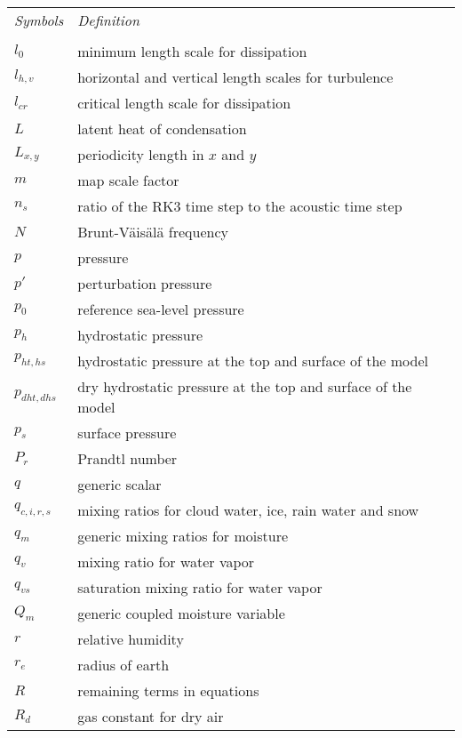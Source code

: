 \newpage
\vskip 5pt
\begin{tabular}{ l p{5.5in} }

{\em Symbols}  & {\em Definition} \\
\\
$l_0$          & minimum length scale for dissipation \\
$l_{h,v}$      & horizontal and vertical length scales for turbulence \\
$l_{cr}$       & critical length scale for dissipation \\
$L$            & latent heat of condensation \\
$L_{x,y}$      & periodicity length in $x$ and $y$ \\
$m$            & map scale factor \\ 
$n_s$          & ratio of the RK3 time step to the acoustic time step \\
$N$            & Brunt-V\"ais\"al\"a frequency \\
$p$            & pressure \\
$p'$           & perturbation pressure \\
$p_0$          & reference sea-level pressure \\
$p_h$          & hydrostatic pressure \\
$p_{ht,hs}$    & hydrostatic pressure at the top and surface of the model \\
$p_{dht,dhs}$  & dry hydrostatic pressure at the top and surface of the model \\
$p_s$          & surface pressure \\
$P_r$          & Prandtl number \\
$q$            & generic scalar \\
$q_{c,i,r,s}$  & mixing ratios for cloud water, ice, rain water and snow \\
$q_m$          & generic mixing ratios for moisture \\
$q_v$          & mixing ratio for water vapor \\
$q_{vs}$       & saturation mixing ratio for water vapor \\
$Q_m$          & generic coupled moisture variable \\
$r$            & relative humidity   \\
$r_e$          & radius of earth \\
$R$            & remaining terms in equations  \\
$R_d$          & gas constant for dry air \\

\end{tabular}
